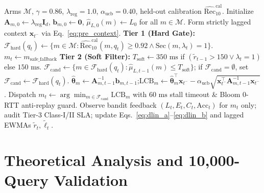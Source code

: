 \documentclass[10pt,journal,compsoc]{IEEEtran}
\begin{document}
\begin{algorithm}[!t]
\caption{CAPQ-Pareto Three-Tier Causal Orchestration}
\label{alg:capq}
\scriptsize
\begin{algorithmic}[1]
\REQUIRE Arms $\mathcal{M}$, $\gamma=0.86$, $\lambda_{\text{reg}}=1.0$, $\alpha_{\text{ucb}}=0.40$, held-out calibration $\widehat{\text{Rec}}_{10}^{\text{cal}}$.
\STATE Initialize $\mathbf{A}_{m,0} \leftarrow \lambda_{\text{reg}}\mathbf{I}_d$, $\mathbf{b}_{m,0} \leftarrow \mathbf{0}$, $\hat{\mu}_{L,0}(m) \leftarrow L_0$ for all $m \in \mathcal{M}$.
    \STATE Form strictly lagged context $\mathbf{x}_{t^-}$ via Eq.~\eqref{eq:pre_context}.
    \STATE \textbf{Tier 1 (Hard Gate):} $\mathcal{F}_{\text{hard}}(q_t) \leftarrow \{m \in \mathcal{M} : \widehat{\text{Rec}}_{10}^{\text{cal}}(m, q_t) \ge 0.92 \land \text{Sec}(m, \lambda_t)=1\}$.
        \STATE $m_t \leftarrow m_{\text{safe\_fallback}}$
    \ELSE
        \STATE \textbf{Tier 2 (Soft Filter):} $T_{\text{soft}} \leftarrow 350\text{ ms}$ if $(\tilde{r}_{t-1}>150 \lor \lambda_t=1)$ else $150\text{ ms}$.
        \STATE $\mathcal{F}_{\text{cand}} \leftarrow \{m \in \mathcal{F}_{\text{hard}}(q_t) : \hat{\mu}_{L,t-1}(m) \le T_{\text{soft}}\}$; if $\mathcal{F}_{\text{cand}}=\emptyset$, set $\mathcal{F}_{\text{cand}} \leftarrow \mathcal{F}_{\text{hard}}(q_t)$.
            \STATE $\hat{\boldsymbol{\theta}}_m \leftarrow \mathbf{A}_{m,t-1}^{-1}\mathbf{b}_{m,t-1}$;\quad $\text{LCB}_m \leftarrow \hat{\boldsymbol{\theta}}_m^\top \mathbf{x}_{t^-} - \alpha_{\text{ucb}}\sqrt{\mathbf{x}_{t^-}^\top \mathbf{A}_{m,t-1}^{-1}\mathbf{x}_{t^-}}$.
        \ENDFOR
        \STATE Dispatch $m_t \leftarrow \arg\min_{m \in \mathcal{F}_{\text{cand}}} \text{LCB}_m$ with $60\text{ ms}$ stall timeout \& Bloom 0-RTT anti-replay guard.
    \ENDIF
    \STATE Observe bandit feedback $(L_t, E_t, C_t, \text{Acc}_t)$ for $m_t$ only; audit Tier-3 Class-I/II SLA; update Eqs.~\eqref{eq:dlin_a}--\eqref{eq:dlin_b} and lagged EWMAs $\tilde{r}_t, \tilde{\ell}_t$.
\ENDFOR
\end{algorithmic}
\end{algorithm}

\section{Theoretical Analysis and 10,000-Query Validation}\label{sec:theory}
\end{document}
